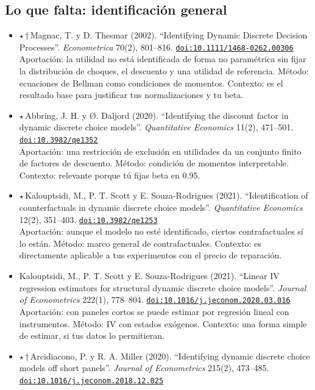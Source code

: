 \documentclass[11pt]{article}
\begin{document}
\subsection*{Lo que falta: identificación general}
\begin{itemize}
\item $\star$\,$\dagger$\,Magnac, T. y D. Thesmar (2002). ``Identifying Dynamic Discrete Decision Processes''. \textit{Econometrica} 70(2), 801--816. \href{https://doi.org/10.1111/1468-0262.00306}{\texttt{doi:10.1111/1468-0262.00306}}\\
Aportación: la utilidad no está identificada de forma no paramétrica sin fijar la distribución de choques, el descuento y una utilidad de referencia. Método: ecuaciones de Bellman como condiciones de momentos. Contexto: es el resultado base para justificar tus normalizaciones y tu beta.
\item $\star$\,Abbring, J. H. y Ø. Daljord (2020). ``Identifying the discount factor in dynamic discrete choice models''. \textit{Quantitative Economics} 11(2), 471--501. \href{https://doi.org/10.3982/qe1352}{\texttt{doi:10.3982/qe1352}}\\
Aportación: una restricción de exclusión en utilidades da un conjunto finito de factores de descuento. Método: condición de momentos interpretable. Contexto: relevante porque tú fijas beta en 0.95.
\item $\star$\,Kalouptsidi, M., P. T. Scott y E. Souza-Rodrigues (2021). ``Identification of counterfactuals in dynamic discrete choice models''. \textit{Quantitative Economics} 12(2), 351--403. \href{https://doi.org/10.3982/qe1253}{\texttt{doi:10.3982/qe1253}}\\
Aportación: aunque el modelo no esté identificado, ciertos contrafactuales sí lo están. Método: marco general de contrafactuales. Contexto: es directamente aplicable a tus experimentos con el precio de reparación.
\item Kalouptsidi, M., P. T. Scott y E. Souza-Rodrigues (2021). ``Linear IV regression estimators for structural dynamic discrete choice models''. \textit{Journal of Econometrics} 222(1), 778--804. \href{https://doi.org/10.1016/j.jeconom.2020.03.016}{\texttt{doi:10.1016/j.jeconom.2020.03.016}}\\
Aportación: con paneles cortos se puede estimar por regresión lineal con instrumentos. Método: IV con estados exógenos. Contexto: una forma simple de estimar, si tus datos lo permitieran.
\item $\star$\,$\dagger$\,Arcidiacono, P. y R. A. Miller (2020). ``Identifying dynamic discrete choice models off short panels''. \textit{Journal of Econometrics} 215(2), 473--485. \href{https://doi.org/10.1016/j.jeconom.2018.12.025}{\texttt{doi:10.1016/j.jeconom.2018.12.025}}\\

\end{itemize}
\end{document}
